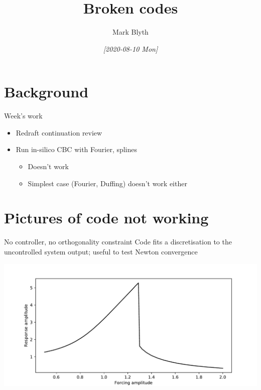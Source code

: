 \documentclass[presentation]{beamer}
\author{Mark Blyth}
\date{\textit{[2020-08-10 Mon]}}
\title{Broken codes}
\begin{document}
\maketitle

\section{Background}
\label{sec:org1da686e}
\begin{frame}[label={sec:org376d3dc}]{Week's work}
\begin{itemize}
\item Redraft continuation review
\item Run in-silico CBC with Fourier, splines
\begin{itemize}
\item Doesn't work
\item Simplest case (Fourier, Duffing) doesn't work either
\end{itemize}
\end{itemize}
\end{frame}
\section{Pictures of code not working}
\label{sec:org6df7608}
\begin{frame}[label={sec:org59dcc17}]{No controller, no orthogonality constraint}
Code fits a discretisation to the uncontrolled system output; useful to test Newton convergence

\begin{center}
\includegraphics[width=.9\linewidth]{./nonorthogonal-controlfree.pdf}
\end{center}
\end{frame}
\end{document}
